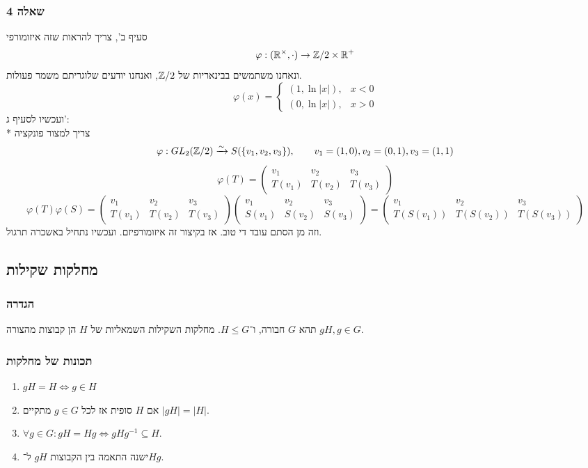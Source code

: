\subsubsection{שאלה 4}
סעיף ב', צריך להראות שזה איזומורפי
\[
	\varphi : (\mathbb{R}^\times, \cdot) \to \mathbb{Z}/2 \times \mathbb{R}^+
\]
ונאחנו משתמשים בבינאריות של $\mathbb{Z}/2$, ואנחנו יודעים שלוגריתם משמר פעולות.
\[
	\varphi(x) = \begin{cases}
		(1, \ln|x|), & x < 0 \\
		(0, \ln|x|), & x > 0
	\end{cases}
\]
ועכשיו לסעיף ג': \\*
צריך למצור פונקציה
\[
	\varphi : GL_2(\mathbb{Z}/2) \xrightarrow{\sim} S(\{v_1, v_2, v_3\}), \qquad v_1 = (1, 0), v_2 = (0, 1), v_3 = (1, 1)
\]
\[
	\varphi(T) = \begin{pmatrix}
		v_1 & v_2 & v_3 \\
		T(v_1) & T(v_2) & T(v_3)
	\end{pmatrix}
\]
\[
	\varphi(T) \varphi(S) =
	\begin{pmatrix}
		v_1 & v_2 & v_3 \\
		T(v_1) & T(v_2) & T(v_3)
	\end{pmatrix}
	\begin{pmatrix}
		v_1 & v_2 & v_3 \\
		S(v_1) & S(v_2) & S(v_3)
	\end{pmatrix}
	=
	\begin{pmatrix}
		v_1 & v_2 & v_3 \\
		T(S(v_1)) & T(S(v_2)) & T(S(v_3))
	\end{pmatrix}
\]
וזה מן הסתם עובד די טוב. אז בקיצור זה איזומורפיזם. ועכשיו נתחיל באשכרה תרגול.

\subsection{מחלקות שקילות}
\subsubsection{הגדרה}
תהא $G$ חבורה, ו־$H \le G$.
מחלקות השקילות השמאליות של $H$ הן קבוצות מהצורה $g H, g \in G$.

\subsubsection{תכונות של מחלקות}
\begin{enumerate}
	\item $gH = H \iff g \in H$
	\item אם $H$ סופית אז לכל $g \in G$ מתקיים $|g H| = |H|$.
	\item $\forall g \in G : g H = H g \iff g H g^{-1} \subseteq H$.
	\item ישנה התאמה בין הקבוצות $g H$ ל־$H g$.
\end{enumerate}

